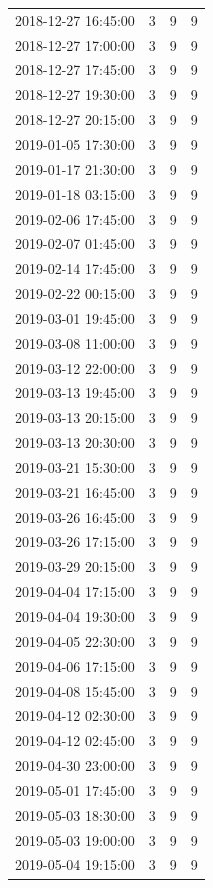 \begin{tabular}{lrrr}
2018-12-27 16:45:00 & 3 & 9 & 9 \\
2018-12-27 17:00:00 & 3 & 9 & 9 \\
2018-12-27 17:45:00 & 3 & 9 & 9 \\
2018-12-27 19:30:00 & 3 & 9 & 9 \\
2018-12-27 20:15:00 & 3 & 9 & 9 \\
2019-01-05 17:30:00 & 3 & 9 & 9 \\
2019-01-17 21:30:00 & 3 & 9 & 9 \\
2019-01-18 03:15:00 & 3 & 9 & 9 \\
2019-02-06 17:45:00 & 3 & 9 & 9 \\
2019-02-07 01:45:00 & 3 & 9 & 9 \\
2019-02-14 17:45:00 & 3 & 9 & 9 \\
2019-02-22 00:15:00 & 3 & 9 & 9 \\
2019-03-01 19:45:00 & 3 & 9 & 9 \\
2019-03-08 11:00:00 & 3 & 9 & 9 \\
2019-03-12 22:00:00 & 3 & 9 & 9 \\
2019-03-13 19:45:00 & 3 & 9 & 9 \\
2019-03-13 20:15:00 & 3 & 9 & 9 \\
2019-03-13 20:30:00 & 3 & 9 & 9 \\
2019-03-21 15:30:00 & 3 & 9 & 9 \\
2019-03-21 16:45:00 & 3 & 9 & 9 \\
2019-03-26 16:45:00 & 3 & 9 & 9 \\
2019-03-26 17:15:00 & 3 & 9 & 9 \\
2019-03-29 20:15:00 & 3 & 9 & 9 \\
2019-04-04 17:15:00 & 3 & 9 & 9 \\
2019-04-04 19:30:00 & 3 & 9 & 9 \\
2019-04-05 22:30:00 & 3 & 9 & 9 \\
2019-04-06 17:15:00 & 3 & 9 & 9 \\
2019-04-08 15:45:00 & 3 & 9 & 9 \\
2019-04-12 02:30:00 & 3 & 9 & 9 \\
2019-04-12 02:45:00 & 3 & 9 & 9 \\
2019-04-30 23:00:00 & 3 & 9 & 9 \\
2019-05-01 17:45:00 & 3 & 9 & 9 \\
2019-05-03 18:30:00 & 3 & 9 & 9 \\
2019-05-03 19:00:00 & 3 & 9 & 9 \\
2019-05-04 19:15:00 & 3 & 9 & 9 \\

\end{tabular}
